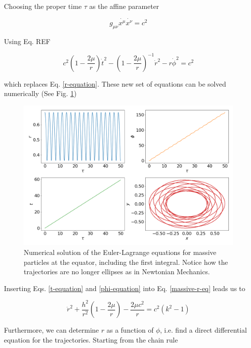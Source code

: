 \documentclass[letterpaper,11pt,onecolumn]{article}
\begin{document}
Choosing the proper time $\tau$ as the affine parameter 

\begin{equation*}
    g_{\mu \nu} \dot{x^\mu} \dot{x^\nu} = c^2
\end{equation*}

Using Eq. {\color{red} REF} 

\begin{equation} \label{massive-r-eq}
    c^2 \left( 1 - \frac{2 \mu}{r} \right) \dot{t}^2  - \left( 1 - \frac{2 \mu}{r} \right)^{-1} \dot{r}^2 - r\dot{\phi}^2  = c^2
\end{equation}

which replaces Eq. \ref{r-equation}. These new set of equations can be solved numerically (See Fig. \ref{fig:massive-set})


\begin{figure}[h!]
    \centering
    \includegraphics[width=0.8\linewidth]{Presentations/Images/2_first_orbits.png}
    \caption{Numerical solution of the Euler-Lagrange equations for massive particles at the equator, including the first integral. Notice how the trajectories are no longer ellipses as in Newtonian Mechanics. }
    \label{fig:massive-set}
\end{figure}


Inserting Eqs. \ref{t-equation} and \ref{phi-equation} into Eq. \ref{massive-r-eq} leads us to 

\begin{equation} \label{massive-r-tau}
    \dot{r}^2 + \frac{h^2}{r^2} \left( 1 - \frac{2\mu}{r}\right) - \frac{2\mu c^2}{r} = c^2 (k^2 - 1)
\end{equation}

Furthermore, we can determine $r$ as a function of $\phi$, i.e. find a direct differential equation for the trajectories. Starting from the chain rule 
\end{document}
